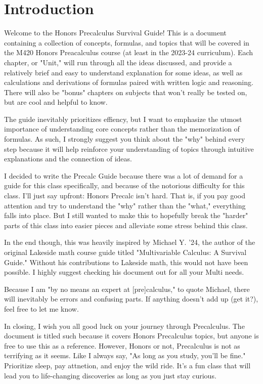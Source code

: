\chapter{Introduction}

Welcome to the Honors Precalculus Survival Guide! This is a document containing a collection of concepts, formulas, and topics that will be covered in the M420 Honors Preacalculus course (at least in the 2023-24 curriculum). Each chapter, or "Unit," will run through all the ideas discussed, and provide a relatively brief and easy to understand explanation for some ideas, as well as calculations and derivations of formulas paired with written logic and reasoning. There will also be "bonus" chapters on subjects that won't really be tested on, but are cool and helpful to know.

The guide inevitably prioritizes effiency, but I want to emphasize the utmost importance of understanding core concepts rather than the memorization of formulas. As such, I strongly suggest you think about the "why" behind every step because it will help reinforce your understanding of topics through intuitive explanations and the connection of ideas.

I decided to write the Precalc Guide because there was a lot of demand for a guide for this class specifically, and because of the notorious difficulty for this class. I'll just say upfront: Honors Precalc isn't hard. That is, if you pay good attention and try to understand the "why" rather than the "what," everything falls into place. But I still wanted to make this to hopefully break the "harder" parts of this class into easier pieces and alleviate some stress behind this class.

In the end though, this was heavily inspired by Michael Y. '24, the author of the original Lakeside math course guide titled "Multivariable Calculus: A Survival Guide." Without his contributions to Lakeside math, this would not have been possible. I highly suggest checking his document out for all your Multi needs.

Because I am "by no means an expert at [pre]calculus," to quote Michael,
there will inevitably be errors and confusing parts. If anything doesn't
add up (get it?), feel free to let me know. 

In closing, I wish you all good luck on your journey through Precalculus. The document is titled such because it covers Honors Precalculus topics, but anyone is free to use this as a reference. However, Honors or not, Precalculus is not as terrifying as it seems. Like I always say, "As long as you study, you'll be fine." Prioritize sleep, pay attnetion, and enjoy the wild ride. It's a fun class that will lead you to life-changing discoveries as long as you just stay curious. 